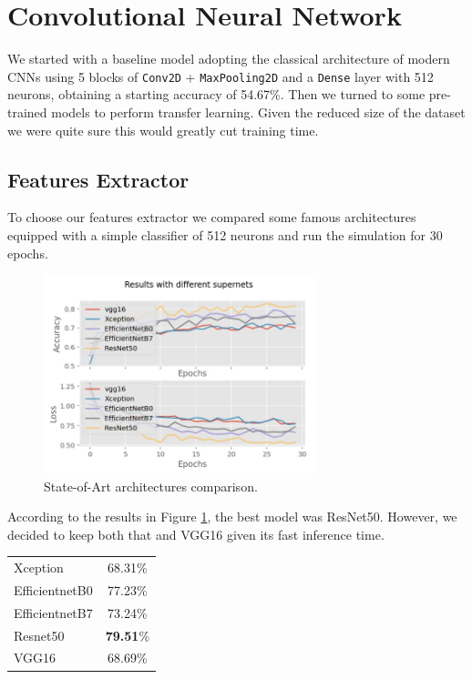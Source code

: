 \documentclass[conference,compsoc,11pt]{IEEEtran}
\begin{document}
\section{Convolutional Neural Network}
We started with a baseline model adopting the classical architecture of modern CNNs using 5 blocks of \verb|Conv2D| + \verb|MaxPooling2D| and a \verb|Dense| layer with 512 neurons, obtaining a starting accuracy of 54.67\%.
Then we turned to some pre-trained models to perform transfer learning. Given the reduced size of the dataset we were quite sure this would greatly cut training time.

\subsection{Features Extractor}\label{sec:features-extractor}
To choose our features extractor we compared some famous architectures equipped with a simple classifier of 512 neurons and run the simulation for 30 epochs.

\begin{figure}[h!]
\centering
\includegraphics[width=3.1in]{supernet.jpg}
\caption{State-of-Art architectures comparison.}
\label{fig_sim}
\end{figure}

According to the results in Figure \ref{fig_sim}, the best model was ResNet50. However, we decided to keep both that and VGG16 given its fast inference time.

\begin{center}
\begin{tabular}{ l c }
\hline\hline
Xception & 68.31\% \\
EfficientnetB0 & 77.23\% \\
EfficientnetB7 & 73.24\% \\
Resnet50 & \textbf{79.51}\% \\
VGG16 & 68.69\% \\
\hline\hline
\end{tabular}
\end{center}
\end{document}
